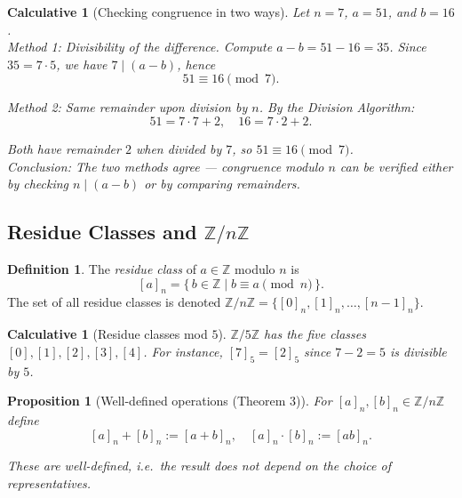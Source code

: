 \documentclass[12pt]{article}
\newtheorem{proposition}[theorem]{Proposition}
\newtheorem{calculative}[theorem]{Calculative}
\theoremstyle{definition}
\newtheorem{definition}{Definition}
\begin{document}
\dotfill

\begin{calculative}[Checking congruence in two ways]
Let $n=7$, $a=51$, and $b=16$.\\

\noindent
\emph{Method 1: Divisibility of the difference.}  
Compute $a-b = 51-16 = 35$. Since $35 = 7\cdot 5$, we have $7\mid(a-b)$, hence
\[
51 \equiv 16 \pmod{7}.
\]

\noindent
\emph{Method 2: Same remainder upon division by $n$.}  
By the Division Algorithm:
\[
51 = 7\cdot 7 + 2, \quad 16 = 7\cdot 2 + 2.
\]

\noindent
Both have remainder $2$ when divided by $7$, so $51 \equiv 16 \pmod{7}$.\\

\noindent
\emph{Conclusion:} The two methods agree — congruence modulo $n$ can be verified either by checking $n\mid(a-b)$ or by comparing remainders.
\end{calculative}


\newpage

\subsection*{Residue Classes and $\mathbb{Z}/n\mathbb{Z}$}

\begin{definition}
The \emph{residue class} of $a\in\mathbb{Z}$ modulo $n$ is
\[
[a]_n = \{\, b\in\mathbb{Z} \mid b\equiv a \pmod{n} \,\}.
\]
The set of all residue classes is denoted $\mathbb{Z}/n\mathbb{Z} = \{[0]_n, [1]_n, \dots, [n-1]_n\}$.
\end{definition}

\dotfill

\begin{calculative}[Residue classes mod $5$]
$\mathbb{Z}/5\mathbb{Z}$ has the five classes $[0],[1],[2],[3],[4]$.  
For instance, $[7]_5 = [2]_5$ since $7-2=5$ is divisible by $5$.
\end{calculative}

\dotfill

\begin{proposition}[Well-defined operations (Theorem 3)]
For $[a]_n, [b]_n\in\mathbb{Z}/n\mathbb{Z}$ define
\[
[a]_n + [b]_n := [a+b]_n,\quad [a]_n\cdot [b]_n := [ab]_n.
\]

\noindent
These are \emph{well-defined}, i.e.\ the result does not depend on the choice of representatives.
\end{proposition}
\end{document}
